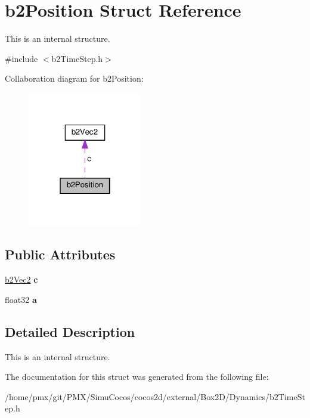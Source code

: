 \hypertarget{structb2Position}{}\section{b2\+Position Struct Reference}
\label{structb2Position}


This is an internal structure.  




{\ttfamily \#include $<$b2\+Time\+Step.\+h$>$}



Collaboration diagram for b2\+Position\+:
\nopagebreak
\begin{figure}[H]
\begin{center}
\leavevmode
\includegraphics[width=142pt]{structb2Position__coll__graph}
\end{center}
\end{figure}
\subsection*{Public Attributes}
\begin{DoxyCompactItemize}
\item 
\mbox{\label{structb2Position_a64b6d764d272385f84e4cac5ceb5af27}} 
\hyperlink{structb2Vec2}{b2\+Vec2} {\bfseries c}
\item 
\mbox{\label{structb2Position_a19d9362011e8c080059ac7f692cc7d8f}} 
float32 {\bfseries a}
\end{DoxyCompactItemize}


\subsection{Detailed Description}
This is an internal structure. 

The documentation for this struct was generated from the following file\+:\begin{DoxyCompactItemize}
\item 
/home/pmx/git/\+P\+M\+X/\+Simu\+Cocos/cocos2d/external/\+Box2\+D/\+Dynamics/b2\+Time\+Step.\+h\end{DoxyCompactItemize}
